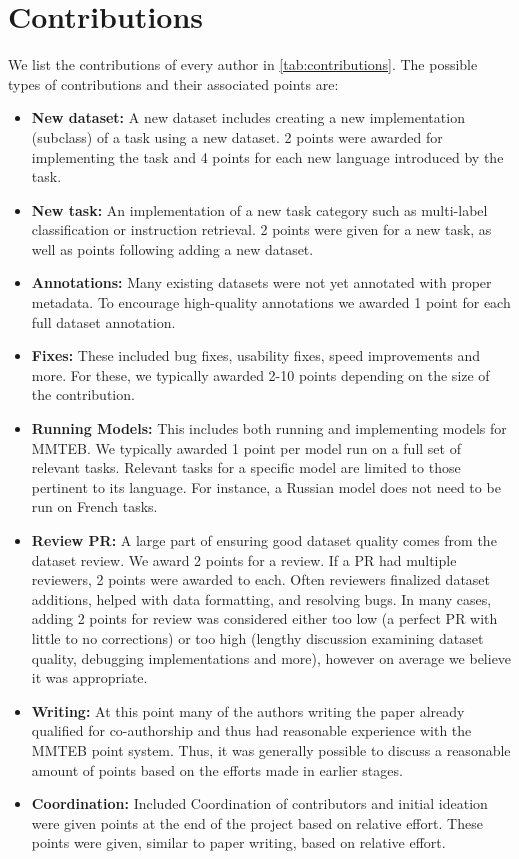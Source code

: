 \section{Contributions}
\label{sec:contributions}

We list the contributions of every author in \autoref{tab:contributions}. The possible types of contributions and their associated points are:
\begin{itemize}
\item \textbf{New dataset:} A new dataset includes creating a new implementation (subclass) of a task using a new dataset. 2 points were awarded for implementing the task and 4 points for each new language introduced by the task. 
\item \textbf{New task:} An implementation of a new task category such as multi-label classification or instruction retrieval. 2 points were given for a new task, as well as points following adding a new dataset.
\item \textbf{Annotations:} Many existing datasets were not yet annotated with proper metadata. To encourage high-quality annotations we awarded 1 point for each full dataset annotation.
\item \textbf{Fixes:} These included bug fixes, usability fixes, speed improvements and more. For these, we typically awarded 2-10 points depending on the size of the contribution.
\item \textbf{Running Models:} This includes both running and implementing models for MMTEB. We typically awarded 1 point per model run on a full set of relevant tasks. Relevant tasks for a specific model are limited to those pertinent to its language. For instance, a Russian model does not need to be run on French tasks.
\item \textbf{Review PR:} A large part of ensuring good dataset quality comes from the dataset review. We award 2 points for a review. If a PR had multiple reviewers, 2 points were awarded to each. Often reviewers finalized dataset additions, helped with data formatting, and resolving bugs. In many cases, adding 2 points for review was considered either too low (a perfect PR with little to no corrections) or too high (lengthy discussion examining dataset quality, debugging implementations and more), however on average we believe it was appropriate.
\item \textbf{Writing:} At this point many of the authors writing the paper already qualified for co-authorship and thus had reasonable experience with the MMTEB point system. Thus, it was generally possible to discuss a reasonable amount of points based on the efforts made in earlier stages.
\item \textbf{Coordination:} Included Coordination of contributors and initial ideation were given points at the end of the project based on relative effort. These points were given, similar to paper writing, based on relative effort.
\end{itemize}

